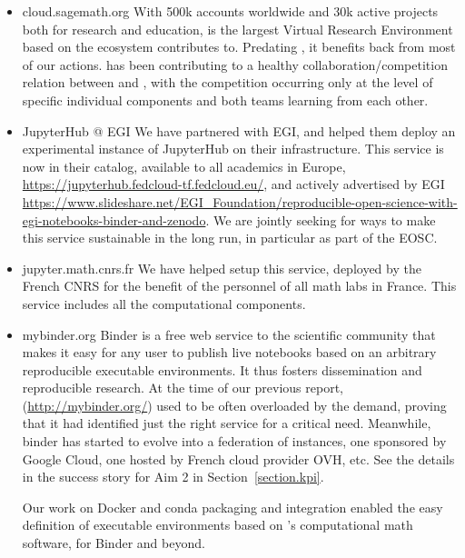 \begin{itemize}
\item{cloud.sagemath.org} With 500k accounts worldwide and 30k active
  projects both for research and education, \SMC is the largest
  Virtual Research Environment based on the ecosystem \ODK contributes
  to. Predating \ODK, it benefits back from most of our actions. \ODK
  has been contributing to a healthy collaboration/competition
  relation between \JupyterHub and \SMC, with the competition
  occurring only at the level of specific individual components and
  both teams learning from each other.

\item{JupyterHub @ EGI} We have partnered with EGI, and helped them
  deploy an experimental instance of JupyterHub on their
  infrastructure. This service is now in their catalog, available
  to all academics in Europe,
  \url{https://jupyterhub.fedcloud-tf.fedcloud.eu/}, and actively
  advertised by EGI
  \url{https://www.slideshare.net/EGI_Foundation/reproducible-open-science-with-egi-notebooks-binder-and-zenodo}.
  We are jointly
  seeking for ways to make this service sustainable in the long run,
  in particular as part of the EOSC.

\item{jupyter.math.cnrs.fr} We have helped setup this \JupyterHub
  service, deployed by the French CNRS for the benefit of the
  personnel of all math labs in France. This service includes all the
  \ODK computational components.

\item{mybinder.org} Binder is a free web service to the scientific
  community that makes it easy for any user to publish live notebooks
  based on an arbitrary reproducible executable environments. It thus
  fosters dissemination and reproducible research. At the time of our
  previous report, (\url{http://mybinder.org/}) used to be often
  overloaded by the demand, proving that it had identified just the
  right service for a critical need. Meanwhile, binder has started to
  evolve into a federation of instances, one sponsored by Google
  Cloud, one hosted by French cloud provider OVH, etc. See the details
  in the success story for Aim 2 in Section~\ref{section.kpi}.

  Our work on Docker and conda packaging
   and \Jupyter
  integration  enabled the easy
  definition of executable environments based on \ODK's computational
  math software, for Binder and beyond.


\end{itemize}
